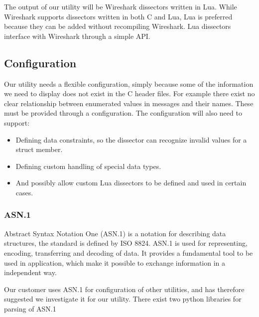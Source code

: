 The output of our utility will be Wireshark dissectors written in Lua. While
Wireshark supports dissectors written in both C and Lua, Lua is preferred
because they can be added without recompiling Wireshark. Lua dissectors
interface with Wireshark through a simple API.

\subsection{Configuration}
Our utility needs a flexible configuration, simply because some of the
information we need to display does not exist in the C header files. For
example there exist no clear relationship between enumerated values in messages
and their names. These must be provided through a configuration. The
configuration will also need to support:
\begin{itemize}
	\item Defining data constraints, so the dissector can recognize invalid
		values for a struct member.
	\item Defining custom handling of special data types.
	\item  And possibly allow custom Lua dissectors to be defined and used in
		certain cases.
\end{itemize}

\subsubsection{ASN.1}
Abstract Syntax Notation One (ASN.1) is a notation for describing data
structures, the standard is defined by ISO 8824. ASN.1 is used for
representing, encoding, transferring and decoding of data. It provides a
fundamental tool to be used in application, which make it possible to exchange
information in a independent way.

Our customer uses ASN.1 for configuration of other utilities, and has therefore
suggested we investigate it for our utility. There exist two python libraries
for parsing of ASN.1

